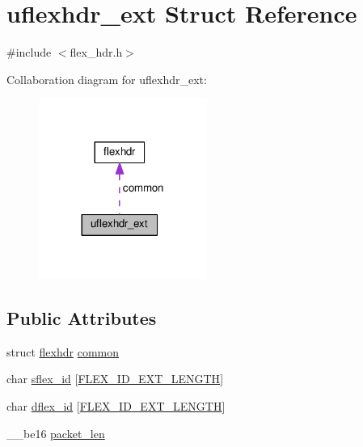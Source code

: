 \hypertarget{structuflexhdr__ext}{}\section{uflexhdr\+\_\+ext Struct Reference}
\label{structuflexhdr__ext}


{\ttfamily \#include $<$flex\+\_\+hdr.\+h$>$}



Collaboration diagram for uflexhdr\+\_\+ext\+:\nopagebreak
\begin{figure}[H]
\begin{center}
\leavevmode
\includegraphics[width=156pt]{structuflexhdr__ext__coll__graph}
\end{center}
\end{figure}
\subsection*{Public Attributes}
\begin{DoxyCompactItemize}
\item 
struct \hyperlink{structflexhdr}{flexhdr} \hyperlink{structuflexhdr__ext_af481d03a7524a0f483e6fd8877c00563}{common}
\item 
char \hyperlink{structuflexhdr__ext_abf9a4c10efddc6b46acf9e25915cdcb3}{sflex\+\_\+id} \mbox{[}\hyperlink{flex__const_8h_a5bfdaffe9863d3fcfc3b90fa2a893bfd}{F\+L\+E\+X\+\_\+\+I\+D\+\_\+\+E\+X\+T\+\_\+\+L\+E\+N\+G\+TH}\mbox{]}
\item 
char \hyperlink{structuflexhdr__ext_a61d75d5fd362fb576a53fa8f973c2380}{dflex\+\_\+id} \mbox{[}\hyperlink{flex__const_8h_a5bfdaffe9863d3fcfc3b90fa2a893bfd}{F\+L\+E\+X\+\_\+\+I\+D\+\_\+\+E\+X\+T\+\_\+\+L\+E\+N\+G\+TH}\mbox{]}
\item 
\+\_\+\+\_\+be16 \hyperlink{structuflexhdr__ext_aa8dd1115a6af281d1a91102926d5cd4d}{packet\+\_\+len}
\end{DoxyCompactItemize}


